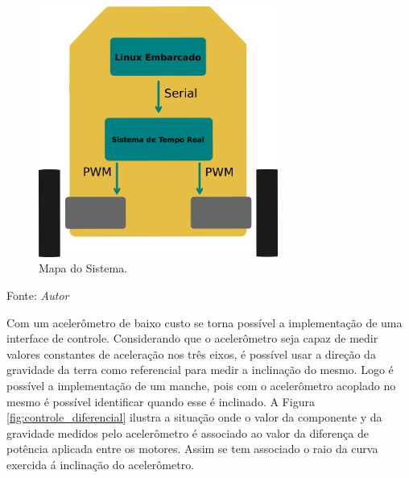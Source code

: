 \begin{figure}[!htb]
  \centering
  \caption{Mapa do Sistema.}
  \label{fig:mapa_sys}
  \includegraphics[width=0.7\textwidth]{./img/concepcao/mapa_sys.png}
\end{figure}
Fonte: \textit{Autor}

\pagebreak

Com um acelerômetro de baixo custo se torna possível a implementação de uma interface de controle. 
Considerando que o acelerômetro seja capaz de medir valores constantes de aceleração nos três eixos, é possível usar a direção da gravidade da terra como referencial para medir a inclinação do mesmo. 
Logo é possível a implementação de um manche, pois com o acelerômetro acoplado no mesmo é possível identificar quando esse é inclinado. A Figura \ref{fig:controle_diferencial} ilustra a situação onde o valor da componente y da gravidade medidos pelo acelerômetro é associado ao valor da diferença de potência aplicada entre os motores. Assim se tem associado o raio da curva exercida á inclinação do acelerômetro.

